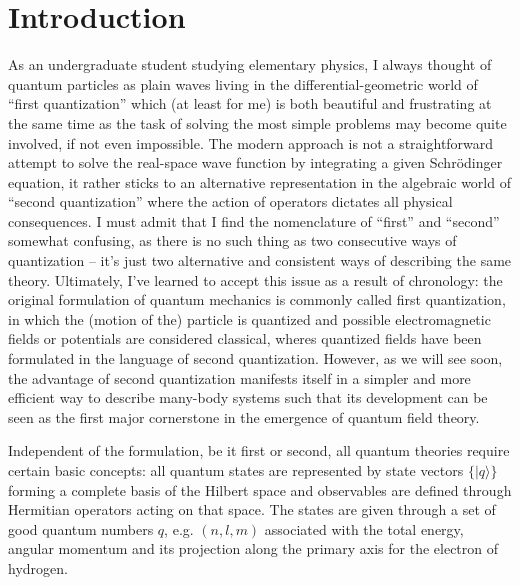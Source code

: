 
\chapter*{Introduction}
\label{ch:introduction}
As an undergraduate student studying elementary physics, I always thought of quantum particles as plain waves living in the differential-geometric world of ``first quan\-ti\-zation'' which (at least for me) is both beautiful and frustrating at the same time as the task of solving the most simple problems may become quite involved, if not even impossible.
The modern approach is not a straightforward attempt to solve the real-space wave function by integrating a given Schrödinger equation, it rather sticks to an alternative representation in the algebraic world of ``second quantization'' where the action of operators dictates all physical consequences.
I must admit that I find the nomenclature of ``first'' and ``second'' somewhat confusing, as there is no such thing as two consecutive ways of quantization -- it's just two alternative and consistent ways of describing the same theory.
Ultimately, I've learned to accept this issue as a result of chronology: the original formulation of quantum mechanics is commonly called first quantization, in which the (motion of the) particle is quantized and possible electromagnetic fields or potentials are considered classical, wheres quantized fields have been formulated in the language of second quantization.
However, as we will see soon, the advantage of second quantization manifests itself in a simpler and more efficient way to describe many-body systems such that its development can be seen as the first major cornerstone in the emergence of quantum field theory.

Independent of the formulation, be it first or second, all quantum theories require certain basic concepts:
all quantum states are represented by state vectors $\{|q\rangle\}$ forming a complete basis of the Hilbert space and observables are defined through Hermitian operators acting on that space.
The states are given through a set of good quantum numbers $q$, e.g. $(n,l,m)$ associated with the total energy, angular momentum and its projection along the primary axis for the electron of hydrogen.

